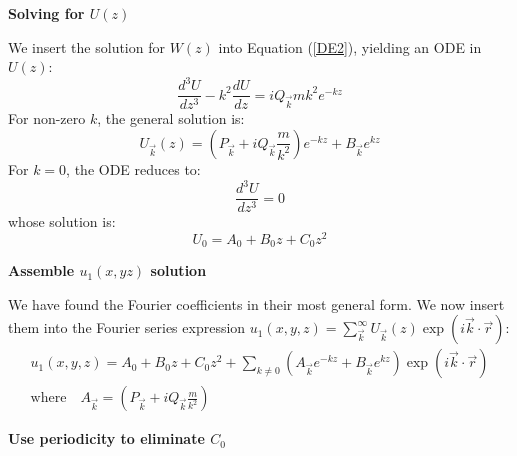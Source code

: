 \documentclass[a4paper]{report}
\begin{document}
\textbf{Solving for $U(z)$}

We insert the solution for $W(z)$ into Equation (\ref{DE2}), yielding an ODE in $U(z)$:
\begin{equation}
\frac{d^3 U}{dz^3} - k^2 \frac{d U}{dz} = i Q_{\vec{k}} m k^2 e^{-kz} 
\end{equation}
For non-zero $k$, the general solution is:
\begin{equation}
U_{\vec{k}}(z) = \left( P_{\vec{k}} + i Q_{\vec{k}} \frac{m}{k^2} \right) e^{-kz}
+ B_{\vec{k}} e^{kz}
\end{equation}
For $k = 0$, the ODE reduces to:
\begin{equation}
\frac{d^3 U}{dz^3} = 0
\end{equation}
whose solution is:
\begin{equation}
U_0 = A_0 + B_0 z + C_0 z^2
\end{equation}


\textbf{Assemble $u_1(x,yz)$ solution}

We have found the Fourier coefficients in their most general form.  We now insert them into the Fourier series expression $ u_1(x,y,z) = \sum_{\vec{k}}^{\infty} U_{\vec{k}}(z) \exp(i \vec{k}\cdot \vec{r}) $:
\begin{gather}
u_1(x,y,z) = A_0 + B_0 z + C_0 z^2 + \sum_{k \neq 0} 
\left(  A_{\vec{k}} e^{-kz} + B_{\vec{k}} e^{kz} \right)
\exp(i \vec{k}\cdot \vec{r})\\
\text{where} \quad
A_{\vec{k}} = \left( P_{\vec{k}} + i Q_{\vec{k}} \frac{m}{k^2} \right)
\end{gather}

\textbf{Use periodicity to eliminate $C_0$}
\end{document}
